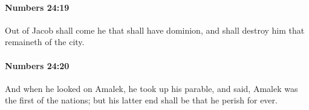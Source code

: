 		\paragraph{Numbers 24:19} %
			\label{NUMBERS-24-19}

			Out of Jacob shall come he that shall have dominion, and shall destroy him that remaineth of the city.


		\paragraph{Numbers 24:20} %
			\label{NUMBERS-24-20}

			And when he looked on Amalek, he took up his parable, and said, Amalek was the first of the nations; but his latter end shall be that he perish for ever.



